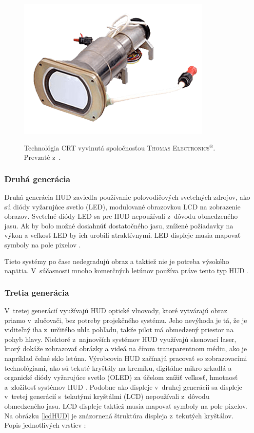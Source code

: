 \begin{figure}[ht]
\centering
\includegraphics[scale=0.7]{obrazky-figures/HUD_SRT.png}
\caption{Technológia CRT vyvinutá spoločnosťou \textsc{Thomas Electronics}$^{\circledR}$. Prevzaté z~\cite{fotoCRT}.}{\label{hudSRT}}
\end{figure}

\subsubsection{Druhá generácia}
Druhá generácia HUD zaviedla používanie polovodičových svetelných zdrojov, ako sú diódy vyžarujúce svetlo (LED), modulované obrazovkou LCD na zobrazenie obrazov. Svetelné diódy LED sa pre HUD nepoužívali z~dôvodu obmedzeného jasu. Ak by bolo možné dosiahnúť dostatočného jasu, znížené požiadavky na výkon a veľkosť LED by ich urobili atraktívnymi. LED displeje musia mapovať symboly na pole pixelov \cite{HUDkniha}.

Tieto systémy po čase nedegradujú obraz a taktiež nie je potreba výsokého napätia. V~súčasnosti mnoho komerčných letúnov používa práve tento typ HUD \cite{HUDkomponenty}.

\subsubsection{Tretia generácia}
V~tretej generácií využívajú HUD optické vlnovody, ktoré vytvárajú obraz priamo v~zlučovači, bez potreby projekčného systému. Jeho nevýhoda je tá, že je viditeľný iba z~určitého uhla pohľadu, takže pilot má obmedzený priestor na pohyb hlavy. Niektoré z~najnovších systémov HUD využívajú skenovací laser, ktorý dokáže zobrazovať obrázky a videá na čírom transparentnom médiu, ako je napríklad čelné sklo letúna. Výrobcovia HUD začínajú pracovať so zobrazovacími technológiami, ako sú tekuté kryštály na kremíku, digitálne mikro zrkadlá a organické diódy vyžarujúce svetlo (OLED) za účelom znížiť veľkosť, hmotnosť a~zložitosť systémov HUD \cite{HUDkomponenty}. Podobne ako displeje v~druhej generácii sa displeje v~tretej generácií s~tekutými kryštálmi (LCD) nepoužívali z~dôvodu obmedzeného jasu. LCD displeje taktiež musia mapovať symboly na pole pixelov. Na obrázku \ref{lcdHUD} je znázornená štruktúra displeja z~tekutých kryštálov. Popis jednotlivých vrstiev \cite{LCDdisplej}:

